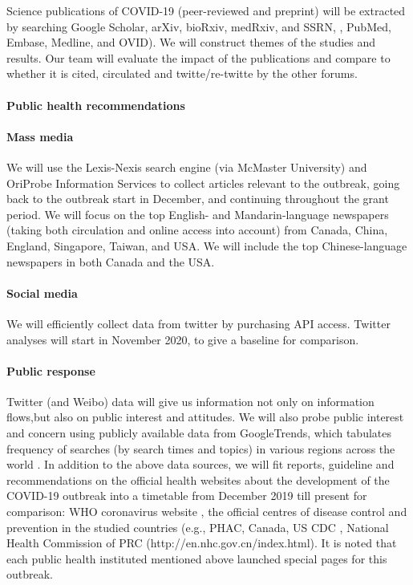 Science publications of COVID-19 (peer-reviewed and preprint) will be extracted by searching Google Scholar, arXiv, bioRxiv, medRxiv, and SSRN, , PubMed, Embase, Medline, and OVID).  We will construct themes of the studies and results.  Our team will evaluate the impact of the publications and compare to whether it is cited, circulated and twitte/re-twitte by the other forums.  


\paragraph{Public health recommendations}

\paragraph{Mass media}

We will use the Lexis-Nexis search engine (via McMaster University) and OriProbe Information Services to collect articles relevant to the outbreak, going back to the outbreak start in December, and continuing throughout the grant period. 
We will focus on the top English- and Mandarin-language newspapers (taking both circulation and online access into account) from 
Canada, China, England, Singapore, Taiwan, and USA.
We will include the top Chinese-language newspapers in both Canada and the USA.

\paragraph{Social media} 
We will efficiently collect data from twitter by purchasing API access. Twitter analyses will start in November 2020, to give a baseline for comparison.  

\paragraph{Public response}
Twitter (and Weibo) data will give us information not only on information flows,but also on public interest and attitudes. We will also probe public interest and concern using publicly available data from GoogleTrends, which tabulates frequency of searches (by search times and topics) in various regions across the world \cite{BousAgac17, MahrBrag19}.
In addition to the above data sources, we will fit reports, guideline and recommendations on the official health websites about the development of the COVID-19 outbreak into a timetable from December 2019 till present for comparison:  WHO coronavirus website , the official centres of disease control and prevention in the studied countries (e.g., PHAC, Canada, US CDC , National Health Commission of PRC (http://en.nhc.gov.cn/index.html).   It is noted that each public health instituted mentioned above launched special pages for this outbreak.

